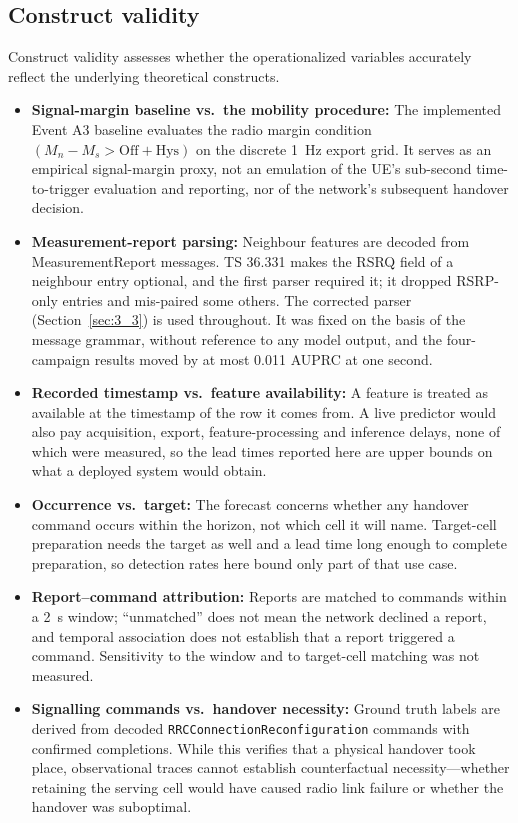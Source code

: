 \subsection{Construct validity}
Construct validity assesses whether the operationalized variables accurately reflect the underlying theoretical constructs.
\begin{itemize}
    \item \textbf{Signal-margin baseline vs.\ the mobility procedure:} The implemented Event A3 baseline evaluates the radio margin condition $(M_n - M_s > \text{Off} + \text{Hys})$ on the discrete 1~Hz export grid. It serves as an empirical signal-margin proxy, not an emulation of the UE's sub-second time-to-trigger evaluation and reporting, nor of the network's subsequent handover decision.
    \item \textbf{Measurement-report parsing:} Neighbour features are decoded from MeasurementReport messages. TS 36.331 makes the RSRQ field of a neighbour entry optional, and the first parser required it; it dropped RSRP-only entries and mis-paired some others. The corrected parser (Section~\ref{sec:3_3}) is used throughout. It was fixed on the basis of the message grammar, without reference to any model output, and the four-campaign results moved by at most 0.011 AUPRC at one second.
    \item \textbf{Recorded timestamp vs.\ feature availability:} A feature is treated as available at the timestamp of the row it comes from. A live predictor would also pay acquisition, export, feature-processing and inference delays, none of which were measured, so the lead times reported here are upper bounds on what a deployed system would obtain.
    \item \textbf{Occurrence vs.\ target:} The forecast concerns whether any handover command occurs within the horizon, not which cell it will name. Target-cell preparation needs the target as well and a lead time long enough to complete preparation, so detection rates here bound only part of that use case.
    \item \textbf{Report--command attribution:} Reports are matched to commands within a 2~s window; ``unmatched'' does not mean the network declined a report, and temporal association does not establish that a report triggered a command. Sensitivity to the window and to target-cell matching was not measured.
    \item \textbf{Signalling commands vs.\ handover necessity:} Ground truth labels are derived from decoded \texttt{RRCConnectionReconfiguration} commands with confirmed completions. While this verifies that a physical handover took place, observational traces cannot establish counterfactual necessity---whether retaining the serving cell would have caused radio link failure or whether the handover was suboptimal.
\end{itemize}

